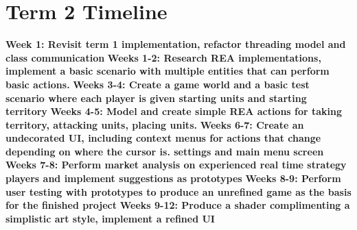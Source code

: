 \documentclass[]{final_report}
\begin{document}
\section{Term 2 Timeline}
\textbf{Week 1: Revisit term 1 implementation, refactor threading model and class communication} \newline
\textbf{Weeks 1-2: Research REA implementations, implement a basic scenario with multiple entities that can perform basic actions. } \newline
\textbf{Weeks 3-4: Create a game world and a basic test scenario where each player is given starting units and starting territory} \newline
\textbf{Weeks 4-5: Model and create simple REA actions for taking territory, attacking units, placing units.} \newline
\textbf{Weeks 6-7: Create an undecorated UI, including context menus for actions that change depending on where the cursor is. settings and main menu screen} \newline
\textbf{Weeks 7-8: Perform market analysis on experienced real time strategy players and implement suggestions as prototypes} \newline
\textbf{Weeks 8-9: Perform user testing with prototypes to produce an unrefined game as the basis for the finished project} \newline
\textbf{Weeks 9-12: Produce a shader complimenting a simplistic art style, implement a refined UI} \newline
\end{document}

